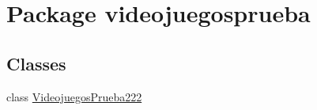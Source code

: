 \hypertarget{namespacevideojuegosprueba}{}\section{Package videojuegosprueba}
\label{namespacevideojuegosprueba}
\subsection*{Classes}
\begin{DoxyCompactItemize}
\item 
class \mbox{\hyperlink{classvideojuegosprueba_1_1_videojuegos_prueba222}{Videojuegos\+Prueba222}}
\end{DoxyCompactItemize}
